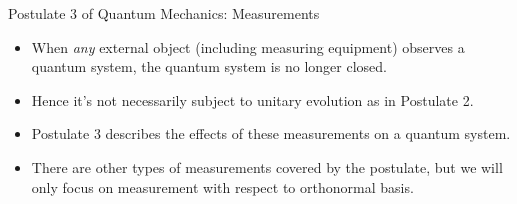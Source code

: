 \documentclass[handout, 10 pt]{beamer}
\begin{document}
\begin{comment}
Recall Schrodinger's cat.
\end{comment}
\begin{frame}{Postulate 3 of Quantum Mechanics: Measurements}
\begin{itemize}
    \item When {\emph{any}} external object (including measuring equipment) observes a quantum system, the quantum system is no longer closed.
    \pause
    \item Hence it's not necessarily subject to unitary evolution as in Postulate 2. 
    \pause
    \item Postulate 3 describes the effects of these measurements on a quantum system.
    \pause
    \item There are other types of measurements covered by the postulate, but we will only focus on measurement with respect to orthonormal basis.
\end{itemize}

\end{frame}

    
\end{document}
